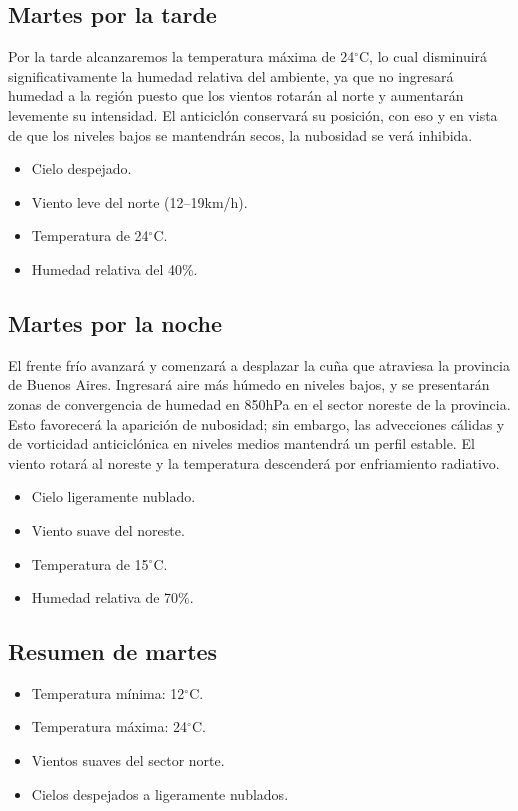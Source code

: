 \documentclass{article}
\begin{document}
\subsection{Martes por la tarde}
Por la tarde alcanzaremos la temperatura máxima de 24$^\circ$C, lo cual disminuirá significativamente la humedad relativa del ambiente, ya que no ingresará
humedad a la región puesto que los vientos rotarán al norte y aumentarán levemente su intensidad. El anticiclón	conservará su posición, con eso y en vista de
que los niveles bajos se mantendrán secos, la nubosidad se verá inhibida.
\begin{itemize}
    \item Cielo despejado.
    \item Viento leve del norte (12--19km/h).
    \item Temperatura de 24$^\circ$C.
    \item Humedad relativa del 40\%.
\end{itemize}

\subsection{Martes por la noche}
El frente frío avanzará y comenzará a desplazar la cuña que atraviesa la provincia de Buenos Aires. Ingresará aire más húmedo en niveles bajos, y se presentarán
zonas de convergencia de humedad en 850hPa en el sector noreste de la provincia. Esto favorecerá la aparición de nubosidad; sin embargo, las advecciones cálidas y
de vorticidad anticiclónica en niveles medios mantendrá un perfil estable. El viento rotará al noreste y la temperatura descenderá por enfriamiento radiativo.

\begin{itemize}
    \item Cielo ligeramente nublado.
    \item Viento suave del noreste.
    \item Temperatura de 15$^\circ$C.
    \item Humedad relativa de 70\%.
\end{itemize}

\subsection{Resumen de martes}
\begin{itemize}
    \item Temperatura mínima: 12$^\circ$C.
    \item Temperatura máxima: 24$^\circ$C.
    \item Vientos suaves del sector norte.
    \item Cielos despejados a ligeramente nublados.
\end{itemize}
\end{document}

